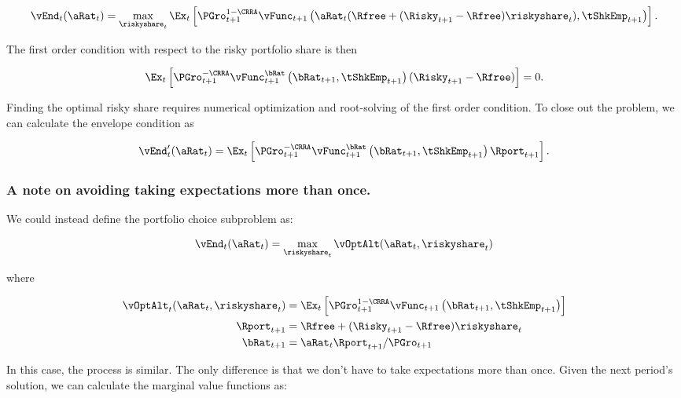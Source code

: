\documentclass[\econtexRoot/SequentialEGM]{subfiles}
\begin{document}
\begin{equation}
	\vEnd_{t}(\aRat_{t}) = \max_{\riskyshare_{t}}  \Ex_{t} \left[ \PGro_{t+1}^{1-\CRRA}
	\vFunc_{t+1}\left(\aRat_{t}(\Rfree + (\Risky_{t+1} - \Rfree) \riskyshare_{t}), \tShkEmp_{t+1}\right)
	\right].
\end{equation}

The first order condition with respect to the risky portfolio share is then

\begin{equation}
	\Ex_{t} \left[ \PGro_{t+1}^{-\CRRA} \vFunc_{t+1}^{\bRat}\left(\bRat_{t+1}, \tShkEmp_{t+1}\right) (\Risky_{t+1} - \Rfree)  \right] = 0.
\end{equation}

Finding the optimal risky share requires numerical optimization and root-solving of the first order condition. To close out the problem, we can calculate the envelope condition as

\begin{equation}
	\vEnd_{t}'(\aRat_{t}) =  \Ex_{t} \left[ \PGro_{t+1}^{-\CRRA} \vFunc_{t+1}^{\bRat}\left(\bRat_{t+1}, \tShkEmp_{t+1}\right) \Rport_{t+1}  \right].
\end{equation}

\subsubsection{A note on avoiding taking expectations more than once.}

We could instead define the portfolio choice subproblem as:

\begin{equation}
	\vEnd_{t}(\aRat_{t}) = \max_{\riskyshare_{t}} \vOptAlt(\aRat_{t}, \riskyshare_{t})
\end{equation}

where

\begin{equation}
	\begin{split}
		\vOptAlt_{t}(\aRat_{t}, \riskyshare_{t}) & =  \Ex_{t} \left[ \PGro_{t+1}^{1-\CRRA} \vFunc_{t+1}\left(\bRat_{t+1}, \tShkEmp_{t+1}\right)   \right] \\
		\Rport_{t+1} & = \Rfree + (\Risky_{t+1} - \Rfree) \riskyshare_{t} \\
		\bRat_{t+1} & = \aRat_{t} \Rport_{t+1} / \PGro_{t+1}
	\end{split}
\end{equation}

In this case, the process is similar. The only difference is that we don't have to take expectations more than once. Given the next period's solution, we can calculate the marginal value functions as:
\end{document}

